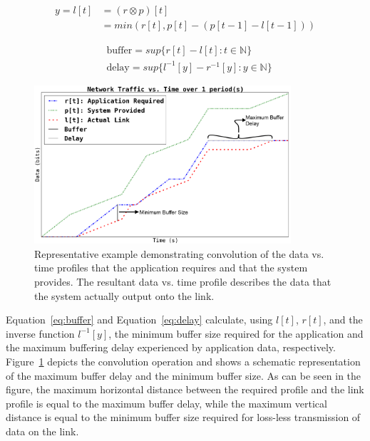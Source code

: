 \begin{equation}
	\label{eq:convolution}
	\begin{split}
		y=l[t] &= (r \otimes p)[t] \\ &= min( r[t] , p[t] -
                (p[t-1] - l[t-1]) )
	\end{split}
\end{equation}

\begin{align}
	\label{eq:buffer}
	&\text{buffer}= sup\{r[t] - l[t] : t \in \mathbb{N}\}\\
	\label{eq:delay}
	&\text{delay} = sup\{l^{-1}[y]-r^{-1}[y] : y \in \mathbb{N}\}
\end{align}

\begin{figure}[h!]
	\centering
        \includegraphics[width=0.85\textwidth]{figs/convolution6.png}
	\caption{Representative example demonstrating convolution of
          the data vs. time profiles that the application requires and
          that the system provides.  The resultant data vs. time
          profile describes the data that the system actually
          output onto the link.}
	\label{fig:convolution}
\end{figure}

Equation~\ref{eq:buffer} and Equation~\ref{eq:delay} calculate, using
$l[t]$, $r[t]$, and the inverse function $l^{-1}[y]$, the minimum
buffer size required for the application and the maximum buffering
delay experienced by application data, respectively.
Figure~\ref{fig:convolution} depicts the convolution operation and
shows a schematic representation of the maximum buffer delay and the
minimum buffer size.  As can be seen in the figure, the maximum
horizontal distance between the required profile and the link profile
is equal to the maximum buffer delay, while the maximum vertical
distance is equal to the minimum buffer size required for loss-less
transmission of data on the link.

